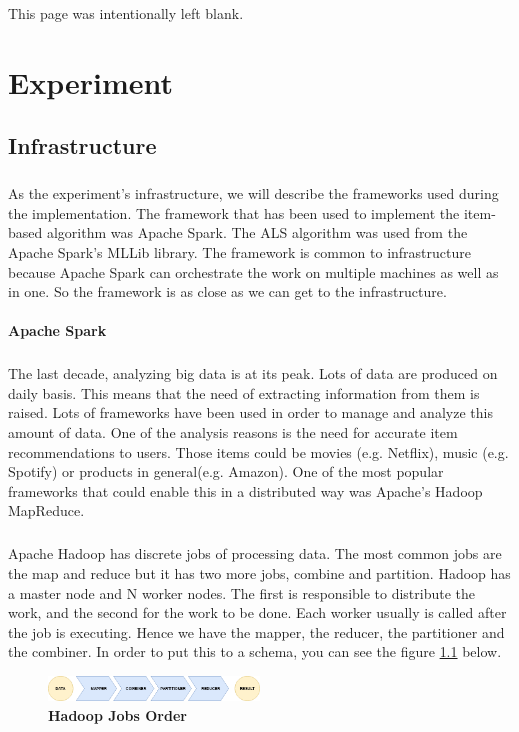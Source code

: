 \newpage
\begin{center}
	This page was intentionally left blank.
\end{center}
\newpage
\chapter{Experiment}
\section{Infrastructure}
\paragraph{}As the experiment's infrastructure, we will describe the frameworks used during the implementation. The framework that has been used to implement the item-based algorithm was Apache Spark. The ALS algorithm was used from the Apache Spark's MLLib library. The framework is common to infrastructure because Apache Spark can orchestrate the work on multiple machines as well as in one. So the framework is as close as we can get to the infrastructure.

\subsubsection{Apache Spark}
\paragraph{}The last decade, analyzing big data is at its peak. Lots of data are produced on daily basis. This means that the need of extracting information from them is raised. 
Lots of frameworks have been used in order to manage and analyze this amount of data. One of the analysis reasons is the need for accurate item recommendations to users. Those items could be movies (e.g. Netflix), music (e.g. Spotify) or products in general(e.g. Amazon). One of the most popular frameworks that could enable this in a distributed way was Apache's Hadoop MapReduce.


\paragraph{}Apache Hadoop has discrete jobs of processing data. The most common jobs are the map and reduce but it has two more jobs, combine and partition. Hadoop has a master node and N worker nodes. The first is responsible to distribute the work, and the second for the work to be done. Each worker usually is called after the job is executing. Hence we have the mapper, the reducer, the partitioner and the combiner. In order to put this to a schema, you can see the figure \ref{hadoopJobsOrder} below.
\\
\begin{figure}[h]
	\centering
	\includegraphics[width=0.5\textwidth]{../images/HadoopMapReduceProcesses.png}
	\caption{\bfseries Hadoop Jobs Order}
	\label{hadoopJobsOrder}
\end{figure}


